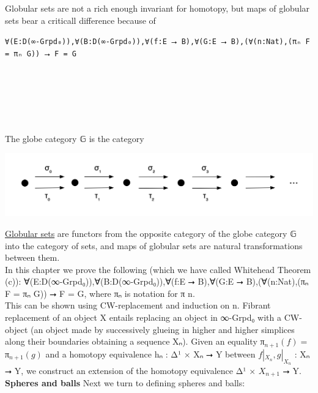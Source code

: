 \documentclass{book}
\theoremstyle{definition}
\newcounter{pcounter}
\newcounter{sectioncount}
\newcounter{subsectioncount}
\renewcommand{\section}[1]{\newpage\ \\ \ \\ \begin{center} \scalebox{1.5}{\texttt{\thesectioncount . #1}} \stepcounter{sectioncount} \setcounter{subsectioncount}{1} \end{center} \begin{center} \ \\ \ \\ \thispagestyle{empty} \end{center}}
\begin{document}
Globular sets are not a rich enough invariant for homotopy, but maps of globular sets bear a criticall difference because of 

\begin{center}
\texttt{∀(E:D(∞-Grpd₀)),∀(B:D(∞-Grpd₀)),∀(f:E ⭢ B),∀(G:E ⭢ B),(∀(n:Nat),(πₙ F = πₙ G)) ⭢ F = G}
\end{center}

\section{Globular Sets}

The globe category 𝔾 is the category

\begin{center}
\includegraphics[scale=0.5]{globecat.png}
\end{center}

\href{https://ncatlab.org/nlab/show/globular+set}{Globular sets} are functors from the opposite category of the globe category 𝔾 into the category of sets, and maps of globular sets are natural transformations between them.\\

In this chapter we prove the following (which we have called Whitehead Theorem (c)): ∀(E:D(∞-Grpd₀)),∀(B:D(∞-Grpd₀)),∀(f:E ⭢ B),∀(G:E ⭢ B),(∀(n:Nat),(πₙ F = πₙ G)) ⭢ F = G, where πₙ is notation for π n.\\

This can be shown using CW-replacement and induction on n. Fibrant replacement of an object X entails replacing an object in ∞-Grpd₀ with a CW-object (an object made by successively glueing in higher and higher simplices along their boundaries obtaining a sequence Xₙ). Given an equality π${}_{n+1}(f) = $π${}_{n+1}(g)$ and a homotopy equivalence hₙ : Δ¹ × Xₙ ⭢ Y between $f|_{X_n}, g|_{X_n}$ : Xₙ ⭢ Y, we construct an extension of the homotopy equivalence Δ¹ × $X_{n+1}$ ⭢ Y.\\

{\bf Spheres and balls} Next we turn to defining spheres and balls:
\end{document}
